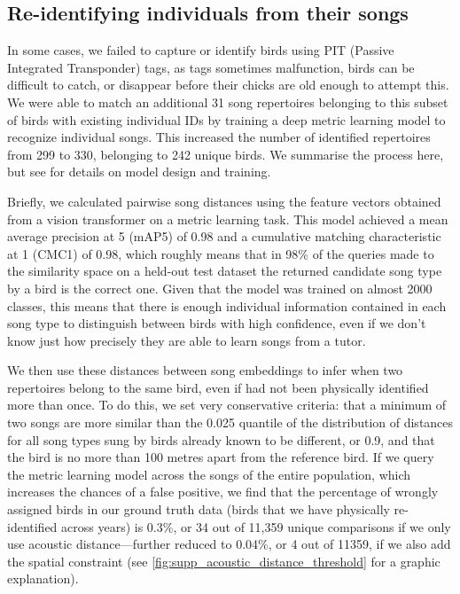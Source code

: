 \documentclass[9pt, onecolumn, twoside, lineno]{gsajnl}
\begin{document}
\subsection{Re-identifying individuals from their songs}

In some cases, we failed to capture or identify birds using PIT (Passive Integrated Transponder) tags, as tags sometimes malfunction, birds can be difficult to catch, or disappear before their chicks are old enough to attempt this.  We were able to match an additional 31 song repertoires belonging to this subset of birds with existing individual IDs by training a deep metric learning model to recognize individual songs. This increased the number of identified repertoires from 299 to 330, belonging to 242 unique birds. We summarise the process here, but see \autocite{merinorecalde2023a} for details on model design and training.

Briefly, we calculated pairwise song distances using the feature vectors obtained from a vision transformer on a metric learning task. This model achieved a mean average precision at 5 (mAP\@5) of 0.98 and a cumulative matching characteristic at 1 (CMC\@1) of 0.98, which roughly means that in 98\% of the queries made to the similarity space on a held-out test dataset the returned candidate song type by a bird is the correct one. Given that the model was trained on almost 2000 classes, this means that there is enough individual information contained in each song type to distinguish between birds with high confidence, even if we don’t know just how precisely they are able to learn songs from a tutor. 

We then use these distances between song embeddings to infer when two repertoires belong to the same bird, even if had not been physically identified more than once. To do this, we set very conservative criteria: that a minimum of two songs are more similar than the 0.025 quantile of the distribution of distances for all song types sung by birds already known to be different, or 0.9, and that the bird is no more than 100 metres apart from the reference bird. If we query the metric learning model across the songs of the entire population, which increases the chances of a false positive, we find that the percentage of wrongly assigned birds in our ground truth data (birds that we have physically re-identified across years) is 0.3\%, or 34 out of 11,359 unique comparisons if we only use acoustic distance---further reduced to 0.04\%, or 4 out of 11359, if we also add the spatial constraint (see \autoref{fig:supp_acoustic_distance_threshold} for a graphic explanation).
\end{document}
